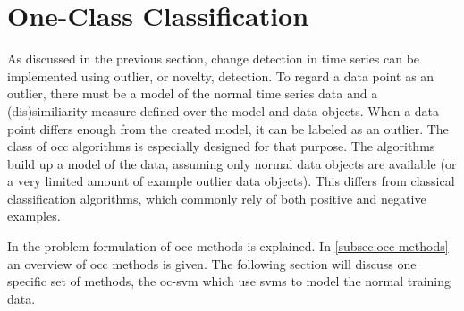 \section{One-Class Classification}\label{sec:one_class_classification}

As discussed in the previous section, change detection in time series can be implemented using outlier, or novelty, detection.
To regard a data point as an outlier, there must be a model of the normal time series data and a (dis)similiarity measure defined over the model and data objects.
When a data point differs enough from the created model, it can be labeled as an outlier.
The class of \gls{occ} algorithms is especially designed for that purpose.
The algorithms build up a model of the data, assuming only normal data objects are available (or a very limited amount of example outlier data objects).
This differs from classical classification algorithms, which commonly rely of both positive and negative examples.

In  the problem formulation of \gls{occ} methods is explained.
In \cref{subsec:occ-methods} an overview of \gls{occ} methods is given.
The following section will discuss one specific set of methods, the \gls{oc-svm} which use \glspl{svm} to model the normal training data.

